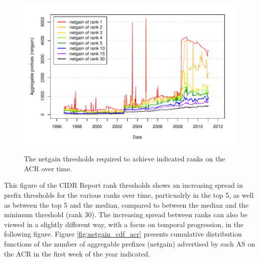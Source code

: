 \begin{figure}[h!]
\begin{centering}
\begin{singlespace}
    \includegraphics[width=6in]{figures/acr_netgain_time.pdf}
    \vspace{-2em}\\
    \caption{The netgain thresholds required to achieve indicated ranks on the
    ACR over time.}
    \label{fig:thresholds}
    \end{singlespace}
\end{centering}
\end{figure}

This figure of the CIDR Report rank thresholds shows an increasing spread in
prefix thresholds for the various ranks over time, particualrly in the top 5,
as well as between the top 5 and the median, compared to between the median and
the minimum threshold (rank 30). The increasing spread between ranks can also
be viewed in a slightly different way, with a focus on temporal progression, in
the following figure. Figure \ref{fig:netgain_cdf_acr} presents cumulative
distribution functions of the number of aggregable prefixes (netgain)
advertised by each AS on the ACR in the first week of the year indicated.

